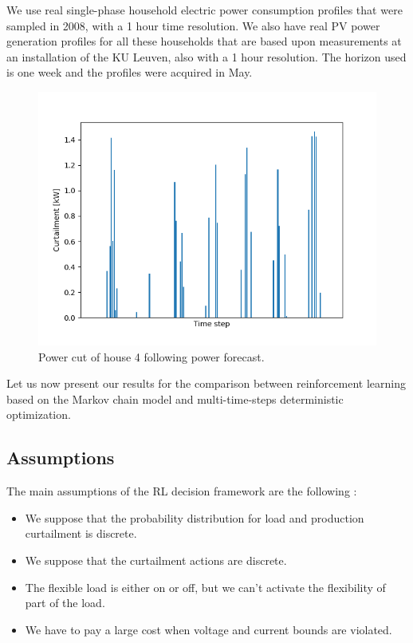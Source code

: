 We use real single-phase household electric power consumption profiles
that were sampled in 2008, with a 1 hour time resolution.
We also have real PV power generation profiles for all these households that are based upon measurements at an installation of the KU Leuven, also with a 1 hour resolution.
The horizon used is one week and the profiles were acquired in May.

\begin{figure}
  \begin{center}
    \includegraphics[scale=0.7]{./img/power_cut.png}
  \end{center}
  \caption{Power cut of house 4 following power forecast.}
  \label{fig:power_cut}
\end{figure}

Let us now present our results for the comparison between reinforcement learning based on the Markov chain model and multi-time-steps deterministic optimization.

\subsection{Assumptions}

The main assumptions of the RL decision framework are the following :
\begin{itemize}
\item We suppose that the probability distribution for load and production curtailment is discrete.
\item We suppose that the curtailment actions are discrete.
\item The flexible load is either on or off, but we can't activate the flexibility of part of the load.
\item We have to pay a large cost when voltage and current bounds are violated.
\end{itemize}

